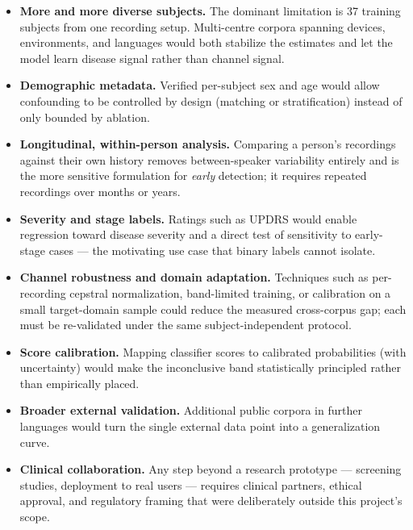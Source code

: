 \begin{itemize}
  \item \textbf{More and more diverse subjects.} The dominant
        limitation is 37 training subjects from one recording setup.
        Multi-centre corpora spanning devices, environments, and
        languages would both stabilize the estimates and let the model
        learn disease signal rather than channel signal.
  \item \textbf{Demographic metadata.} Verified per-subject sex and
        age would allow confounding to be controlled by design
        (matching or stratification) instead of only bounded by
        ablation.
  \item \textbf{Longitudinal, within-person analysis.} Comparing a
        person's recordings against their own history removes
        between-speaker variability entirely and is the more sensitive
        formulation for \emph{early} detection; it requires repeated
        recordings over months or years.
  \item \textbf{Severity and stage labels.} Ratings such as UPDRS
        would enable regression toward disease severity and a direct
        test of sensitivity to early-stage cases --- the motivating
        use case that binary labels cannot isolate.
  \item \textbf{Channel robustness and domain adaptation.} Techniques
        such as per-recording cepstral normalization, band-limited
        training, or calibration on a small target-domain sample could
        reduce the measured cross-corpus gap; each must be re-validated
        under the same subject-independent protocol.
  \item \textbf{Score calibration.} Mapping classifier scores to
        calibrated probabilities (with uncertainty) would make the
        inconclusive band statistically principled rather than
        empirically placed.
  \item \textbf{Broader external validation.} Additional public
        corpora in further languages would turn the single external
        data point into a generalization curve.
  \item \textbf{Clinical collaboration.} Any step beyond a research
        prototype --- screening studies, deployment to real users ---
        requires clinical partners, ethical approval, and regulatory
        framing that were deliberately outside this project's scope.
\end{itemize}
